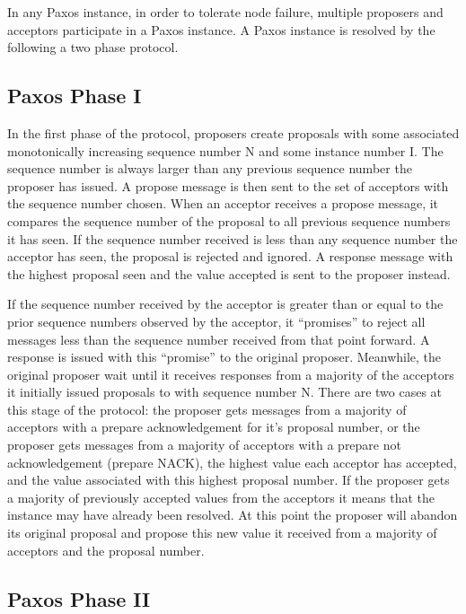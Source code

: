 \documentclass{article}
\begin{document}
In any Paxos instance, in order to tolerate node failure, multiple proposers and acceptors participate in a Paxos instance.
A Paxos instance is resolved by the following a two phase protocol.

\subsection{Paxos Phase I}

In the first phase of the protocol, proposers create proposals with some associated monotonically increasing sequence number N and some instance number I. 
The sequence number is always larger than any previous sequence number the proposer has issued. 
A propose message is then sent to the set of acceptors with the sequence number chosen. 
When an acceptor receives a propose message, it compares the sequence number of the proposal to all previous sequence numbers it has seen.
If the sequence number received is less than any sequence number the acceptor has seen, the proposal is rejected and ignored.
A response message with the highest proposal seen and the value accepted is sent to the proposer instead.

If the sequence number received by the acceptor is greater than or equal to the prior sequence numbers observed by the acceptor, it ``promises'' to reject all messages less than the sequence number received from that point forward.
A response is issued with this ``promise'' to the original proposer.
Meanwhile, the original proposer wait until it receives responses from a majority of the acceptors it initially issued proposals to with sequence number N.
There are two cases at this stage of the protocol: the proposer gets messages from a majority of acceptors with a prepare acknowledgement for it's proposal number, 
or the proposer gets messages from a majority of acceptors with a prepare not acknowledgement (prepare NACK), the highest value each acceptor has accepted, and the value associated with this highest proposal number.
If the proposer gets a majority of previously accepted values from the acceptors it means that the instance may have already been resolved.
At this point the proposer will abandon its original proposal and propose this new value it received from a majority of acceptors and the proposal number.

\subsection{Paxos Phase II}
\end{document}
